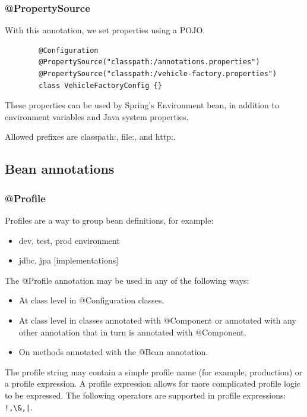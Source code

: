 \documentclass{scrartcl}
\begin{document}
\subsubsection{@PropertySource}

    With this annotation, we set properties using a POJO.

    \begin{lstlisting}
        @Configuration
        @PropertySource("classpath:/annotations.properties")
        @PropertySource("classpath:/vehicle-factory.properties")
        class VehicleFactoryConfig {}
    \end{lstlisting}

    These properties can be used by Spring's Environment bean, in addition to environment variables and Java system properties.

    Allowed prefixes are classpath:, file:, and http:.

\subsection{Bean annotations}

\subsubsection{@Profile}

    Profiles are a way to group bean definitions, for example:

     \begin{itemize}
        \item dev, test, prod environment
        \item jdbc, jpa [implementations]
    \end{itemize}

   The @Profile annotation may be used in any of the following ways:

   \begin{itemize}
       \item At class level in @Configuration classes.
       \item At class level in classes annotated with @Component or annotated with any other annotation that in turn is annotated with @Component.
       \item On methods annotated with the @Bean annotation.
   \end{itemize}

    The profile string may contain a simple profile name (for example, production) or a profile expression. A profile expression allows for more complicated profile logic to be expressed. The following operators are supported in profile expressions: \lstinline{!,\&,|}.
\end{document}
